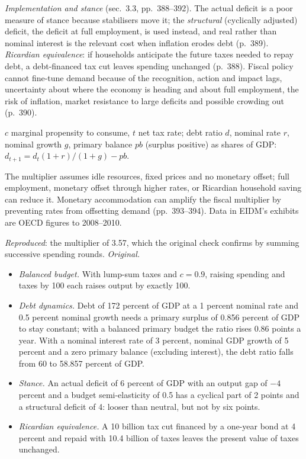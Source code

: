 \begin{qfdefinition}
\emph{Implementation and stance} (sec.~3.3, pp.~388--392). The actual deficit is a poor measure of stance because stabilisers move it; the \emph{structural} (cyclically adjusted) deficit, the deficit at full employment, is used instead, and real rather than nominal interest is the relevant cost when inflation erodes debt (p.~389). \emph{Ricardian equivalence}: if households anticipate the future taxes needed to repay debt, a debt-financed tax cut leaves spending unchanged (p.~388). Fiscal policy cannot fine-tune demand because of the recognition, action and impact lags, uncertainty about where the economy is heading and about full employment, the risk of inflation, market resistance to large deficits and possible crowding out (p.~390).

 $c$ marginal propensity to consume, $t$ net tax rate; debt ratio $d$, nominal rate $r$, nominal growth $g$, primary balance $pb$ (surplus positive) as shares of GDP: $d_{t+1}=d_t(1+r)/(1+g)-pb$.

 The multiplier assumes idle resources, fixed prices and no monetary offset; full employment, monetary offset through higher rates, or Ricardian household saving can reduce it. Monetary accommodation can amplify the fiscal multiplier by preventing rates from offsetting demand (pp.~393--394). Data in EIDM's exhibits are OECD figures to 2008--2010.

 \emph{Reproduced}: the multiplier of 3.57, which the original check confirms by summing successive spending rounds. \emph{Original.}
\begin{itemize}
\item \emph{Balanced budget.} With lump-sum taxes and $c=0.9$, raising spending and taxes by 100 each raises output by exactly 100.
\item \emph{Debt dynamics.} Debt of 172 percent of GDP at a 1 percent nominal rate and 0.5 percent nominal growth needs a primary surplus of 0.856 percent of GDP to stay constant; with a balanced primary budget the ratio rises 0.86 points a year. With a nominal interest rate of 3 percent, nominal GDP growth of 5 percent and a zero primary balance (excluding interest), the debt ratio falls from 60 to 58.857 percent of GDP.
\item \emph{Stance.} An actual deficit of 6 percent of GDP with an output gap of $-4$ percent and a budget semi-elasticity of 0.5 has a cyclical part of 2 points and a structural deficit of 4: looser than neutral, but not by six points.
\item \emph{Ricardian equivalence.} A 10 billion tax cut financed by a one-year bond at 4 percent and repaid with 10.4 billion of taxes leaves the present value of taxes unchanged.
\end{itemize}


\end{qfdefinition}
